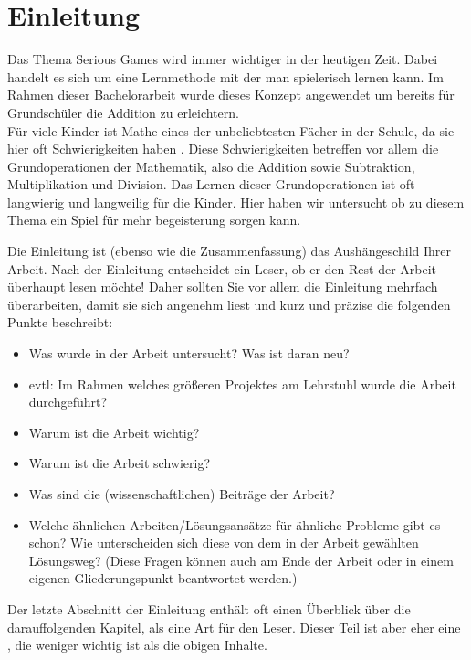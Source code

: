 
\chapter{Einleitung}
Das Thema Serious Games wird immer wichtiger in der heutigen Zeit. Dabei handelt es sich um eine Lernmethode mit der man spielerisch lernen kann. Im Rahmen dieser Bachelorarbeit wurde dieses Konzept angewendet um bereits für Grundschüler die Addition zu erleichtern. 
\\
Für viele Kinder ist Mathe eines der unbeliebtesten Fächer in der Schule, da sie hier oft Schwierigkeiten haben . Diese Schwierigkeiten betreffen vor allem die Grundoperationen der Mathematik, also die Addition sowie Subtraktion, Multiplikation und Division. Das Lernen dieser Grundoperationen ist oft langwierig und langweilig für die Kinder. Hier haben wir untersucht ob zu diesem Thema ein Spiel für mehr begeisterung sorgen kann. 


Die Einleitung ist (ebenso wie die Zusammenfassung) das Aushängeschild Ihrer Arbeit. Nach der Einleitung entscheidet ein Leser, ob er den Rest der Arbeit überhaupt lesen möchte! Daher sollten Sie vor allem die Einleitung mehrfach überarbeiten, damit sie sich angenehm liest und kurz und präzise die folgenden Punkte beschreibt:
\begin{itemize}
  \item Was wurde in der Arbeit untersucht? Was ist daran neu?
  \item evtl: Im Rahmen welches größeren Projektes am Lehrstuhl wurde die Arbeit durchgeführt?
  \item Warum ist die Arbeit wichtig?
  \item Warum ist die Arbeit schwierig?
  \item Was sind die (wissenschaftlichen) Beiträge der Arbeit?
  \item Welche ähnlichen Arbeiten/Lösungsansätze für ähnliche Probleme gibt es schon? Wie unterscheiden sich diese von dem in der Arbeit gewählten Lösungsweg? (Diese Fragen können auch am Ende der Arbeit oder in einem eigenen Gliederungspunkt beantwortet werden.)
\end{itemize}

Der letzte Abschnitt der Einleitung enthält oft einen Überblick über die darauffolgenden Kapitel, als eine Art  für den Leser. Dieser Teil ist aber eher eine , die weniger wichtig ist als die obigen Inhalte.

